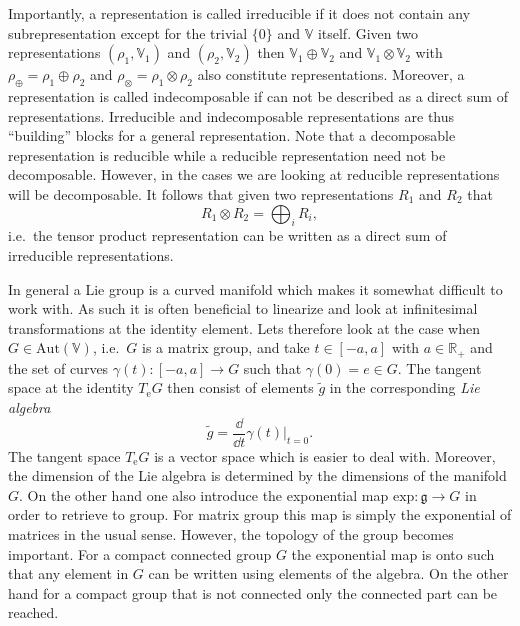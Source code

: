 \documentclass[11pt]{report}
\begin{document}
Importantly, a representation is called irreducible if it does not contain any subrepresentation except for the trivial $\{0\}$ and $\mathbb{V}$ itself. Given two representations $(\rho_1,\mathbb{V}_1)$ and $(\rho_2,\mathbb{V}_2)$ then $\mathbb{V}_1\oplus\mathbb{V}_2$ and $\mathbb{V}_1\otimes\mathbb{V}_2$ with $\rho_\oplus = \rho_1\oplus\rho_2$ and $\rho_\otimes = \rho_1\otimes\rho_2$ also constitute representations. Moreover, a representation is called indecomposable if can not be described as a direct sum of representations. Irreducible and indecomposable representations are thus ``building'' blocks for a general representation. Note that a decomposable representation is reducible while a reducible representation need not be decomposable. However, in the cases we are looking at reducible representations will be decomposable. It follows that given two representations $R_1$ and $R_2$ that 
\begin{equation}
    R_1\otimes R_2 = \bigoplus_i R_i,
\end{equation}
i.e.\ the tensor product representation can be written as a direct sum of irreducible representations.


In general a Lie group is a curved manifold which makes it somewhat difficult to work with. As such it is often beneficial to linearize and look at infinitesimal transformations at the identity element. Lets therefore look at the case when $G\in \text{Aut}(\mathbb{V})$, i.e.\ $G$ is a matrix group, and take $t\in [-a,a]$ with $a\in\mathbb{R_+}$ and the set of curves $\gamma(t): [-a,a]\to G$ such that $\gamma(0)= e\in G$. The tangent space at the identity $T_\mathrm{e}G$ then consist of elements $\tilde{g}$ in the corresponding \emph{Lie algebra}
\begin{equation}
\tilde{g} = \frac{\dd}{\dd t}\gamma(t)|_{t=0}.
\end{equation}
The tangent space $T_\mathrm{e}G$ is a vector space which is easier to deal with. Moreover, the dimension of the Lie algebra is determined by the dimensions of the manifold $G$. On the other hand one also introduce the exponential map $\text{exp}: \mathfrak{g}\to G$ in order to retrieve to group. For matrix group this map is simply the exponential of matrices in the usual sense. However, the topology of the group becomes important. For a compact connected group $G$ the exponential map is onto such that any element in $G$ can be written using elements of the algebra. On the other hand for a compact group that is not connected only the connected part can be reached. 
\end{document}
